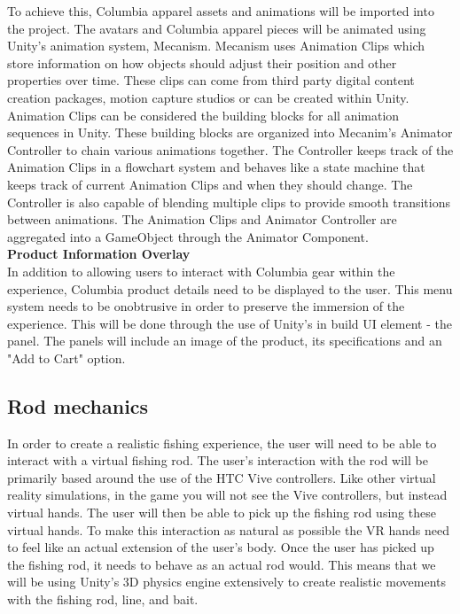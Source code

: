 \documentclass[10pt,journal,compsoc,onecolumn, draftclsnofoot]{IEEEtran}
\begin{document}
To achieve this, Columbia apparel assets and animations will be imported into the project. The avatars and Columbia apparel pieces will be animated using Unity's animation system, Mecanism. Mecanism uses Animation Clips which store information on how objects should adjust their position and other properties over time. These clips can come from third party digital content creation packages, motion capture studios or can be created within Unity. Animation Clips can be considered the building blocks for all animation sequences in Unity. These building blocks are organized into Mecanim's Animator Controller to chain various animations together. The Controller keeps track of the Animation Clips in a flowchart system and behaves like a state machine that keeps track of current Animation Clips and when they should change. The Controller is also capable of blending multiple clips to provide smooth transitions between animations. The Animation Clips and Animator Controller are aggregated into a GameObject through the Animator Component.\cite{unity_animation} \\

\hangindent=0.5cm \textbf{Product Information Overlay} \\

In addition to allowing users to interact with Columbia gear within the experience, Columbia product details need to be displayed to the user. This menu system needs to be onobtrusive in order to preserve the immersion of the experience. This will be done through the use of Unity's in build UI element - the panel. The panels will include an image of the product, its specifications and an "Add to Cart" option. \\


\subsection{Rod mechanics}
In order to create a realistic fishing experience, the user will need to be able to interact with a virtual fishing rod.
The user's interaction with the rod will be primarily based around the use of the HTC Vive controllers.
Like other virtual reality simulations, in the game you will not see the Vive controllers, but instead virtual hands.
The user will then be able to pick up the fishing rod using these virtual hands.
To make this interaction as natural as possible the VR hands need to feel like an actual extension of the user's body.
Once the user has picked up the fishing rod, it needs to behave as an actual rod would.
This means that we will be using Unity's 3D physics engine extensively to create realistic movements with the fishing rod, line, and bait.
\end{document}

